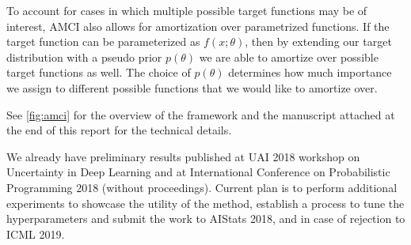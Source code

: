\documentclass[12pt]{article}
\begin{document}
To account for cases in which multiple possible target functions may be of interest, AMCI also allows for amortization over parametrized functions.
If the target function can be parameterized as $f(x;\theta)$, then by extending our target distribution with a pseudo prior $p(\theta)$ we are able to amortize over possible target functions as well.
The choice of $p(\theta)$ determines how much importance we assign to different possible functions that we would like to amortize over.

See \autoref{fig:amci} for the overview of the framework and
the manuscript attached at the end of this report for the technical details.

We already have preliminary results published at UAI 2018 workshop on Uncertainty in Deep Learning and at International Conference on Probabilistic Programming 2018 (without proceedings).
Current plan is to perform additional experiments to showcase the utility of the method, establish a process to tune the hyperparameters and submit the work to AIStats 2018, and in case of rejection to ICML 2019.
 
\end{document}
